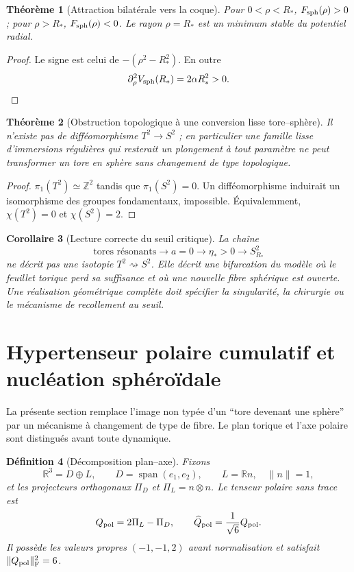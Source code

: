\documentclass[11pt,a4paper]{article}
\newtheorem{theorem}{Théorème}[section]
\newtheorem{corollary}[theorem]{Corollaire}
\newtheorem{definition}[theorem]{Définition}
\newcommand{\R}{\mathbb R}
\newcommand{\Z}{\mathbb Z}
\begin{document}
\begin{theorem}[Attraction bilatérale vers la coque]\label{thm:shell}
Pour $0<\rho<R_*$, $F_{\rm sph}(\rho)>0$ ; pour $\rho>R_*$, $F_{\rm sph}(\rho)<0$. Le rayon $\rho=R_*$ est un minimum stable du potentiel radial.
\end{theorem}

\begin{proof}
Le signe est celui de $-(\rho^2-R_*^2)$. En outre
\[
 \partial_\rho^2V_{\rm sph}(R_*)=2\alpha R_*^2>0.
\]
\end{proof}

\begin{theorem}[Obstruction topologique à une conversion lisse tore--sphère]\label{thm:noisotopy}
Il n'existe pas de difféomorphisme $T^2\to S^2$ ; en particulier une famille lisse d'immersions régulières qui resterait un plongement à tout paramètre ne peut transformer un tore en sphère sans changement de type topologique.
\end{theorem}

\begin{proof}
$\pi_1(T^2)\simeq\Z^2$ tandis que $\pi_1(S^2)=0$. Un difféomorphisme induirait un isomorphisme des groupes fondamentaux, impossible. Équivalemment, $\chi(T^2)=0$ et $\chi(S^2)=2$.
\end{proof}

\begin{corollary}[Lecture correcte du seuil critique]
La chaîne
\[
 \text{tores résonants}\longrightarrow a=0\longrightarrow \eta_*>0
 \longrightarrow S^2_{R_*}
\]
ne décrit pas une isotopie $T^2\rightsquigarrow S^2$. Elle décrit une bifurcation du modèle où le feuillet torique perd sa suffisance et où une nouvelle fibre sphérique est ouverte. Une réalisation géométrique complète doit spécifier la singularité, la chirurgie ou le mécanisme de recollement au seuil.
\end{corollary}


\section{Hypertenseur polaire cumulatif et nucléation sphéroïdale}

La présente section remplace l'image non typée d'un ``tore devenant une sphère'' par un mécanisme à changement de type de fibre. Le plan torique et l'axe polaire sont distingués avant toute dynamique.

\begin{definition}[Décomposition plan--axe]
Fixons
\[
 \R^3=D\oplus L,
 \qquad D=\operatorname{span}(e_1,e_2),
 \qquad L=\R n,
 \quad \|n\|=1,
\]
et les projecteurs orthogonaux $\Pi_D$ et $\Pi_L=n\otimes n$. Le tenseur polaire sans trace est
\begin{equation}\label{eq:Qpol}
 Q_{\rm pol}=2\Pi_L-\Pi_D,
 \qquad \widehat Q_{\rm pol}=\frac1{\sqrt6}Q_{\rm pol}.
\end{equation}
Il possède les valeurs propres $(-1,-1,2)$ avant normalisation et satisfait
$\|Q_{\rm pol}\|_{\rm F}^2=6$.
\end{definition}
\end{document}

